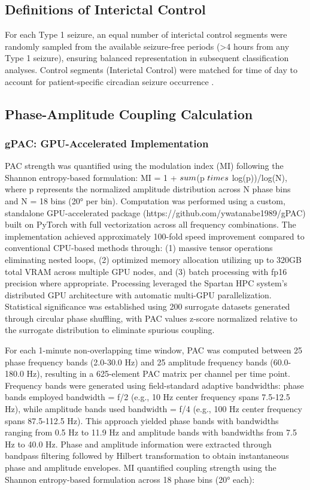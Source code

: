 \subsection{Definitions of Interictal Control}

For each Type 1 seizure, an equal number of interictal control segments were randomly sampled from the available seizure-free periods (>4 hours from any Type 1 seizure), ensuring balanced representation in subsequent classification analyses. Control segments (Interictal Control) were matched for time of day to account for patient-specific circadian seizure occurrence \cite{loddenkemper2011chrono} \cite{loddenkemper2011circad} \cite{karoly_circadian_2017}.


\subsection{Phase-Amplitude Coupling Calculation}
\subsubsection{gPAC: GPU-Accelerated Implementation}
PAC strength was quantified using the modulation index (MI) \cite{Tort} following the Shannon entropy-based formulation: MI = 1 + $\\sum$(p $\\times$ log(p))/log(N), where p represents the normalized amplitude distribution across N phase bins and N = 18 bins (20° per bin). Computation was performed using a custom, standalone GPU-accelerated package (https://github.com/ywatanabe1989/gPAC) built on PyTorch with full vectorization across all frequency combinations. The implementation achieved approximately 100-fold speed improvement compared to conventional CPU-based methods through: (1) massive tensor operations eliminating nested loops, (2) optimized memory allocation utilizing up to 320GB total VRAM across multiple GPU nodes, and (3) batch processing with fp16 precision where appropriate. Processing leveraged the Spartan HPC system's distributed GPU architecture  with automatic multi-GPU parallelization. Statistical significance was established using 200 surrogate datasets generated through circular phase shuffling, with PAC values z-score normalized relative to the surrogate distribution to eliminate spurious coupling.

	For each 1-minute non-overlapping time window, PAC was computed between 25 phase frequency bands (2.0-30.0 Hz) and 25 amplitude frequency bands (60.0-180.0 Hz), resulting in a 625-element PAC matrix per channel per time point. Frequency bands were generated using field-standard adaptive bandwidths: phase bands employed bandwidth = f/2 (e.g., 10 Hz center frequency spans 7.5-12.5 Hz), while amplitude bands used bandwidth = f/4 (e.g., 100 Hz center frequency spans 87.5-112.5 Hz). This approach yielded phase bands with bandwidths ranging from 0.5 Hz to 11.9 Hz and amplitude bands with bandwidths from 7.5 Hz to 40.0 Hz. Phase and amplitude information were extracted through bandpass filtering followed by Hilbert transformation to obtain instantaneous phase and amplitude envelopes. MI quantified coupling strength using the Shannon entropy-based formulation across 18 phase bins (20° each):

